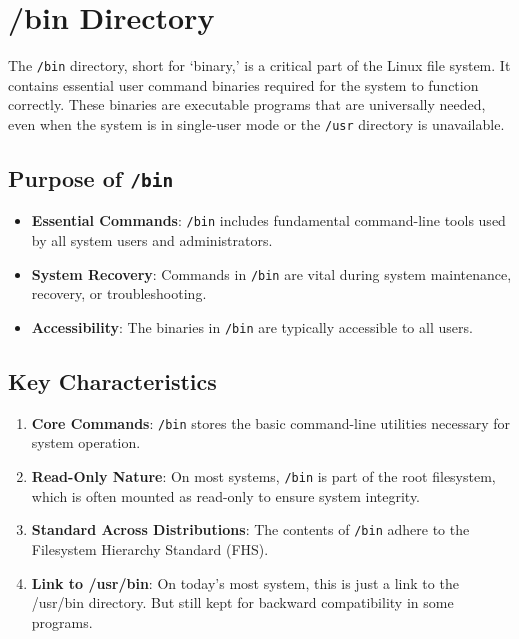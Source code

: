 \section{/bin Directory}

The \texttt{/bin} directory, short for `binary,' is a critical part of the Linux file system. It contains essential user command binaries required for the system to function correctly. These binaries are executable programs that are universally needed, even when the system is in single-user mode or the \texttt{/usr} directory is unavailable.

\subsection*{Purpose of \texttt{/bin}}

\begin{itemize}
    \item \textbf{Essential Commands}: \texttt{/bin} includes fundamental command-line tools used by all system users and administrators.
    \item \textbf{System Recovery}: Commands in \texttt{/bin} are vital during system maintenance, recovery, or troubleshooting.
    \item \textbf{Accessibility}: The binaries in \texttt{/bin} are typically accessible to all users.
\end{itemize}

\subsection*{Key Characteristics}

\begin{enumerate}
    \item \textbf{Core Commands}: \texttt{/bin} stores the basic command-line utilities necessary for system operation.
    \item \textbf{Read-Only Nature}: On most systems, \texttt{/bin} is part of the root filesystem, which is often mounted as read-only to ensure system integrity.
    \item \textbf{Standard Across Distributions}: The contents of \texttt{/bin} adhere to the Filesystem Hierarchy Standard (FHS).
    \item \textbf{Link to /usr/bin}: On today's most system, this is just a link to the /usr/bin directory. But still kept for backward compatibility in some programs.
\end{enumerate}

